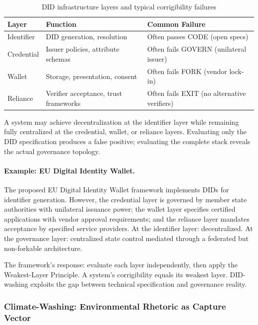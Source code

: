 \documentclass{article}
\begin{document}
\begin{table}[htbp]
\centering
\small
\caption{DID infrastructure layers and typical corrigibility failures}
\label{tab:did_layers}
\begin{tabular}{@{}lp{5cm}p{5cm}@{}}
\toprule
\textbf{Layer} & \textbf{Function} & \textbf{Common Failure} \\
\midrule
Identifier & DID generation, resolution & Often passes CODE (open specs) \\
Credential & Issuer policies, attribute schemas & Often fails GOVERN (unilateral issuer) \\
Wallet & Storage, presentation, consent & Often fails FORK (vendor lock-in) \\
Reliance & Verifier acceptance, trust frameworks & Often fails EXIT (no alternative verifiers) \\
\bottomrule
\end{tabular}
\end{table}

A system may achieve decentralization at the identifier layer while remaining fully centralized at the credential, wallet, or reliance layers. Evaluating only the DID specification produces a false positive; evaluating the complete stack reveals the actual governance topology.

\paragraph{Example: EU Digital Identity Wallet.} The proposed EU Digital Identity Wallet framework implements DIDs for identifier generation. However, the credential layer is governed by member state authorities with unilateral issuance power; the wallet layer specifies certified applications with vendor approval requirements; and the reliance layer mandates acceptance by specified service providers. At the identifier layer: decentralized. At the governance layer: centralized state control mediated through a federated but non-forkable architecture.

The framework's response: evaluate each layer independently, then apply the Weakest-Layer Principle. A system's corrigibility equals its weakest layer. DID-washing exploits the gap between technical specification and governance reality.

\subsubsection{Climate-Washing: Environmental Rhetoric as Capture Vector}
\label{subsubsec:climatewashing}
\end{document}
